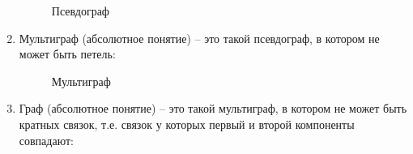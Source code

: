 \documentclass[a4paper]{article}
\begin{document}
\begin{enumerate}
\begin{enumerate}
    \end{enumerate}
\newpage
    \begin{figure}[!hb]
      \caption{Псевдограф}
    \end{figure}
  \item Мультиграф (абсолютное понятие) – это такой псевдограф, в котором не может быть петель:
    \begin{figure}[!h]
      \caption{Мультиграф}
    \end{figure}
  \item Граф (абсолютное понятие) – это такой мультиграф, в котором не может быть кратных связок, т.е. связок у которых первый и второй компоненты совпадают:

\end{enumerate}
\end{document}
